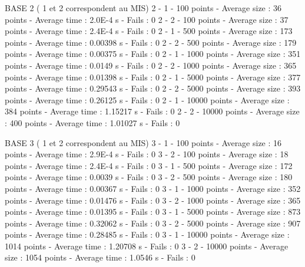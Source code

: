 BASE 2 ( 1 et 2 correspondent au MIS)
2 - 1 - 100 points - Average size : 36 points - Average time : 2.0E-4 s - Fails : 0
2 - 2 - 100 points - Average size : 37 points - Average time : 2.4E-4 s - Fails : 0
2 - 1 - 500 points - Average size : 173 points - Average time : 0.00398 s - Fails : 0
2 - 2 - 500 points - Average size : 179 points - Average time : 0.00375 s - Fails : 0
2 - 1 - 1000 points - Average size : 351 points - Average time : 0.0149 s - Fails : 0
2 - 2 - 1000 points - Average size : 365 points - Average time : 0.01398 s - Fails : 0
2 - 1 - 5000 points - Average size : 377 points - Average time : 0.29543 s - Fails : 0
2 - 2 - 5000 points - Average size : 393 points - Average time : 0.26125 s - Fails : 0
2 - 1 - 10000 points - Average size : 384 points - Average time : 1.15217 s - Fails : 0
2 - 2 - 10000 points - Average size : 400 points - Average time : 1.01027 s - Fails : 0

BASE 3 ( 1 et 2 correspondent au MIS)
3 - 1 - 100 points - Average size : 16 points - Average time : 2.9E-4 s - Fails : 0
3 - 2 - 100 points - Average size : 18 points - Average time : 2.4E-4 s - Fails : 0
3 - 1 - 500 points - Average size : 172 points - Average time : 0.0039 s - Fails : 0
3 - 2 - 500 points - Average size : 180 points - Average time : 0.00367 s - Fails : 0
3 - 1 - 1000 points - Average size : 352 points - Average time : 0.01476 s - Fails : 0
3 - 2 - 1000 points - Average size : 365 points - Average time : 0.01395 s - Fails : 0
3 - 1 - 5000 points - Average size : 873 points - Average time : 0.32062 s - Fails : 0
3 - 2 - 5000 points - Average size : 907 points - Average time : 0.28485 s - Fails : 0
3 - 1 - 10000 points - Average size : 1014 points - Average time : 1.20708 s - Fails : 0
3 - 2 - 10000 points - Average size : 1054 points - Average time : 1.0546 s - Fails : 0